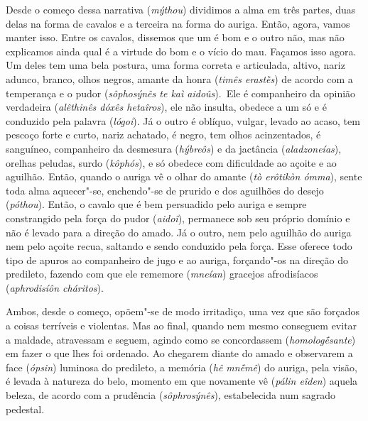 Desde o começo dessa narrativa (\emph{mýthou}) dividimos a alma em três
partes, duas delas na forma de cavalos e a terceira na forma do auriga.
Então, agora, vamos manter isso. \bekker{[253d]} Entre os cavalos, dissemos
que um é bom e o outro não, mas não explicamos ainda qual é a virtude do
bom e o vício do mau. Façamos isso agora. Um deles tem uma bela postura,
uma forma correta e articulada, altivo, nariz adunco, branco, olhos
negros, amante da honra (\emph{timês erastḕs}) de acordo com a
temperança e o pudor (\emph{sôphosýnês te kaì aidoûs}).~Ele é
companheiro da opinião verdadeira (\emph{alêthinês dóxês hetaîros}), ele
não insulta, obedece a um só e é conduzido pela palavra (\emph{lógoi}).
\bekker{[253e]} Já o outro é oblíquo, vulgar, levado ao acaso, tem pescoço
forte e curto, nariz achatado, é negro, tem olhos acinzentados, é
sanguíneo, companheiro da desmesura (\emph{hýbreôs}) e da jactância
(\emph{aladzoneías}), orelhas peludas, surdo (\emph{kôphós}), e só
obedece com dificuldade ao açoite e ao aguilhão. Então, quando o auriga
vê o olhar do amante (\emph{tò erôtikòn ómma}), sente toda alma
aquecer"-se, enchendo"-se de prurido e dos aguilhões do desejo
(\emph{póthou}). \bekker{[254a]} Então, o cavalo que é bem persuadido pelo
auriga e sempre constrangido pela força do pudor (\emph{aidoî}),
permanece sob seu próprio domínio e não é levado para a direção do
amado. Já o outro, nem pelo aguilhão do auriga nem pelo açoite recua,
saltando e sendo conduzido pela força. Esse oferece todo tipo de apuros
ao companheiro de jugo e ao auriga, forçando"-os na direção do predileto,
fazendo com que ele rememore (\emph{mneían}) gracejos afrodisíacos
(\emph{aphrodisíôn cháritos}).

Ambos, desde o começo, opõem"-se de modo irritadiço, \bekker{[254b]} uma vez
que são forçados a coisas terríveis e violentas. Mas ao final, quando
nem mesmo conseguem evitar a maldade, atravessam e seguem, agindo como
se concordassem (\emph{homologḗsante}) em fazer o que lhes foi ordenado.
Ao chegarem diante do amado e observarem a face (\emph{ópsin}) luminosa
do predileto, a memória (\emph{hê mnḗmê}) do auriga, pela visão, é
levada à natureza do belo, momento em que novamente vê (\emph{pálin
eîden}) aquela beleza, de acordo com a prudência (\emph{sôphrosýnês}),
estabelecida num sagrado pedestal.

